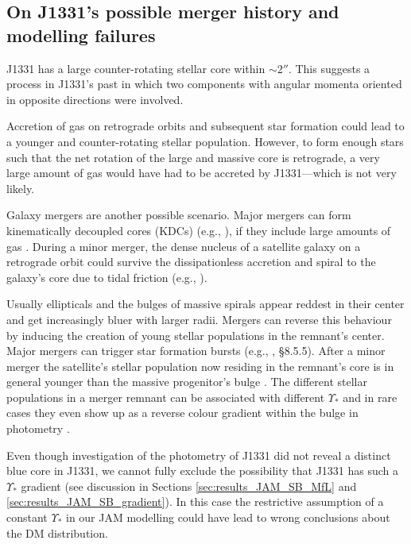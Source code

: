 \documentclass[useAMS,usenatbib]{mnras}
\begin{document}
\subsection{On J1331's possible merger history and modelling failures}

J1331 has a large counter-rotating stellar core within $\sim 2''$. This suggests a process in J1331's past in which two components with angular momenta oriented in opposite directions were involved.

Accretion of gas on retrograde orbits and subsequent star formation could lead to a younger and counter-rotating stellar population. However, to form enough stars such that the net rotation of the large and massive core is retrograde, a very large amount of gas would have had to be accreted by J1331---which is not very likely. 

Galaxy mergers are another possible scenario. Major mergers can form kinematically decoupled cores (KDCs) (e.g., \citealt{2011MNRAS.414.2923K,2015ApJ...802L...3T}), if they include large amounts of gas \citep{2010ApJ...723..818H}. During a minor merger, the dense nucleus of a satellite galaxy on a retrograde orbit could survive the dissipationless accretion and spiral to the galaxy's core due to tidal friction (e.g., \citealt{1984ApJ...287..577K,1988ApJ...327L..55F}). 

Usually ellipticals and the bulges of massive spirals appear reddest in their center and get increasingly bluer with larger radii. Mergers can reverse this behaviour by inducing the creation of young stellar populations in the remnant's center. Major mergers can trigger star formation bursts (e.g., \citealt{2008gady.book.....B}, \S 8.5.5). After a minor merger the satellite's stellar population now residing in the remnant's core is in general younger than the massive progenitor's bulge \citep{1996AJ....112..839C,2010MNRAS.404.1775T}. The different stellar populations in a merger remnant can be associated with different $\Upsilon_*$ and in rare cases they even show up as a reverse colour gradient within the bulge in photometry \citep{1990ApJ...361..381B, 1997ApJ...481..710C}.

Even though investigation of the photometry of J1331 did not reveal a distinct blue core in J1331, we cannot fully exclude the possibility that J1331 has such a $\Upsilon_*$ gradient (see discussion in Sections \ref{sec:results_JAM_SB_MfL} and \ref{sec:results_JAM_SB_gradient}). In this case the restrictive assumption of a constant $\Upsilon_*$ in our JAM modelling could have lead to wrong conclusions about the DM distribution.
\end{document}
